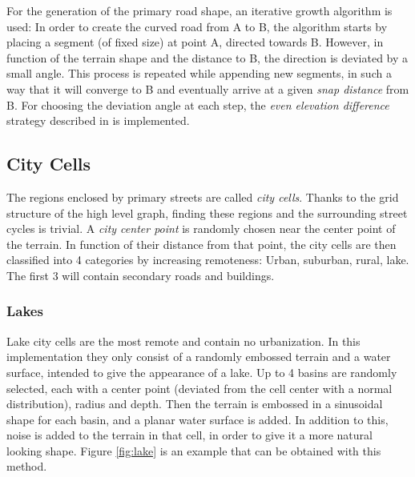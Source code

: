\documentclass[a4paper,12pt]{scrartcl}
\begin{document}
For the generation of the primary road shape, an iterative growth algorithm is used: In order to create the curved road from A to B, the algorithm starts by placing a segment (of fixed size) at point A, directed towards B. However, in function of the terrain shape and the distance to B, the direction is deviated by a small angle. This process is repeated while appending new segments, in such a way that it will converge to B and eventually arrive at a given \emph{snap distance} from B. For choosing the deviation angle at each step, the \emph{even elevation difference} strategy described in \cite{Kell2007} is implemented.


\subsection{City Cells}
The regions enclosed by primary streets are called \emph{city cells}. Thanks to the grid structure of the high level graph, finding these regions and the surrounding street cycles is trivial. A \emph{city center point} is randomly chosen near the center point of the terrain. In function of their distance from that point, the city cells are then classified into 4 categories by increasing remoteness: Urban, suburban, rural, lake. The first 3 will contain secondary roads and buildings.

\subsubsection{Lakes}
Lake city cells are the most remote and contain no urbanization. In this implementation they only consist of a randomly embossed terrain and a water surface, intended to give the appearance of a lake. Up to 4 basins are randomly selected, each with a center point (deviated from the cell center with a normal distribution), radius and depth. Then the terrain is embossed in a sinusoidal shape for each basin, and a planar water surface is added. In addition to this, noise is added to the terrain in that cell, in order to give it a more natural looking shape. Figure \ref{fig:lake} is an example that can be obtained with this method.
\end{document}
